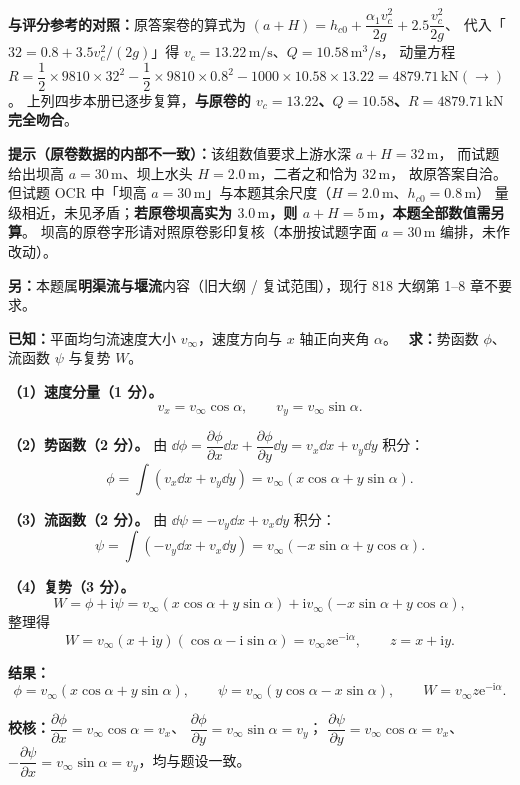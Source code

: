 \begin{tishi}
\textbf{与评分参考的对照：}原答案卷的算式为
$(a+H)=h_{c0}+\dfrac{\alpha_1v_c^{2}}{2g}+2.5\dfrac{v_c^{2}}{2g}$、
代入「$32=0.8+3.5v_c^{2}/(2g)$」得 $v_c=13.22\,\mathrm{m/s}$、$Q=10.58\,\mathrm{m^{3}/s}$，
动量方程 $R=\dfrac{1}{2}\times9810\times32^{2}-\dfrac{1}{2}\times9810\times0.8^{2}-1000\times10.58\times13.22
=4879.71\,\mathrm{kN}(\rightarrow)$。
上列四步本册已逐步复算，\textbf{与原卷的 $v_c=13.22$、$Q=10.58$、$R=4879.71\,\mathrm{kN}$ 完全吻合}。

\textbf{提示（原卷数据的内部不一致）：}该组数值要求上游水深 $a+H=32\,\mathrm{m}$，
而试题给出坝高 $a=30\,\mathrm{m}$、坝上水头 $H=2.0\,\mathrm{m}$，二者之和恰为 $32\,\mathrm{m}$，
故原答案自洽。但试题 OCR 中「坝高 $a=30\,\mathrm{m}$」与本题其余尺度（$H=2.0\,\mathrm{m}$、$h_{c0}=0.8\,\mathrm{m}$）
量级相近，未见矛盾；\textbf{若原卷坝高实为 $3.0\,\mathrm{m}$，则 $a+H=5\,\mathrm{m}$，本题全部数值需另算}。
坝高的原卷字形请对照原卷影印复核（本册按试题字面 $a=30\,\mathrm{m}$ 编排，未作改动）。

\textbf{另：}本题属\textbf{明渠流与堰流}内容（旧大纲 / 复试范围），现行 818 大纲第 1--8 章不要求。
\end{tishi}


\begin{jie}
\textbf{已知：}平面均匀流速度大小 $v_\infty$，速度方向与 $x$ 轴正向夹角 $\alpha$。
\ \textbf{求：}势函数 $\phi$、流函数 $\psi$ 与复势 $W$。

\textbf{（1）速度分量（1 分）。}
\[
v_x=v_\infty\cos\alpha,\qquad v_y=v_\infty\sin\alpha.
\]

\textbf{（2）势函数（2 分）。}
由 $\dd\phi=\dfrac{\partial\phi}{\partial x}\dd x+\dfrac{\partial\phi}{\partial y}\dd y=v_x\dd x+v_y\dd y$ 积分：
\[
\phi=\int\left(v_x\dd x+v_y\dd y\right)=v_\infty\left(x\cos\alpha+y\sin\alpha\right).
\]

\textbf{（3）流函数（2 分）。}
由 $\dd\psi=-v_y\dd x+v_x\dd y$ 积分：
\[
\psi=\int\left(-v_y\dd x+v_x\dd y\right)
=v_\infty\left(-x\sin\alpha+y\cos\alpha\right).
\]

\textbf{（4）复势（3 分）。}
\[
W=\phi+\mathrm{i}\psi
=v_\infty\left(x\cos\alpha+y\sin\alpha\right)+\mathrm{i}v_\infty\left(-x\sin\alpha+y\cos\alpha\right),
\]
整理得
\[
W=v_\infty(x+\mathrm{i}y)\left(\cos\alpha-\mathrm{i}\sin\alpha\right)
=v_\infty z\mathrm{e}^{-\mathrm{i}\alpha},
\qquad z=x+\mathrm{i}y .
\]

\textbf{结果：}
\[
\boxed{\phi=v_\infty\left(x\cos\alpha+y\sin\alpha\right)},\qquad
\boxed{\psi=v_\infty\left(y\cos\alpha-x\sin\alpha\right)},\qquad
\boxed{W=v_\infty z\mathrm{e}^{-\mathrm{i}\alpha}} .
\]

\textbf{校核：}$\dfrac{\partial\phi}{\partial x}=v_\infty\cos\alpha=v_x$、
$\dfrac{\partial\phi}{\partial y}=v_\infty\sin\alpha=v_y$；
$\dfrac{\partial\psi}{\partial y}=v_\infty\cos\alpha=v_x$、
$-\dfrac{\partial\psi}{\partial x}=v_\infty\sin\alpha=v_y$，均与题设一致。
\end{jie}

